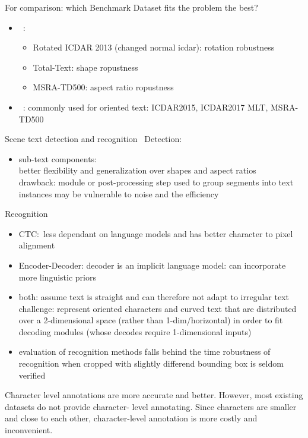 For comparison: which Benchmark Dataset fits the problem the best?
\begin{itemize}
    \item~\cite{liao_mask_2020}:
        \begin{itemize}
            \item Rotated ICDAR 2013 (changed normal icdar): rotation robustness
            \item Total-Text: shape ropustness
            \item MSRA-TD500: aspect ratio ropustness
        \end{itemize}
    \item~\cite{yang_learning_2021}: commonly used for oriented text: ICDAR2015, ICDAR2017 MLT,
        MSRA-TD500
\end{itemize}

Scene text detection and recognition~\cite{long_scene_2021}
Detection:
\begin{itemize}
    \item sub-text components: \\
        better flexibility and generalization over shapes and aspect ratios\\
        drawback: module or post-processing step used to group segments into text instances
        may be vulnerable to noise and the efficiency
\end{itemize}
Recognition
\begin{itemize}
    \item CTC:\ less dependant on language models and has better character to pixel alignment
    \item Encoder-Decoder: decoder is an implicit language model: can incorporate more linguistic priors
    \item both: assume text is straight and can therefore not adapt to irregular text
        challenge: represent oriented characters and curved text that are distributed over a
        2-dimensional space
            (rather than 1-dim/horizontal) in order to fit decoding modules (whose decodes require
            1-dimensional inputs)
        \item evaluation of recognition methods falls behind the time robustness of recognition when
            cropped with slightly differend bounding box is seldom verified
\end{itemize}
Character level annotations are more accurate and better. However, most existing datasets do not
provide character- level annotating. Since characters are smaller and close to each other,
character-level annotation is more costly and inconvenient.
